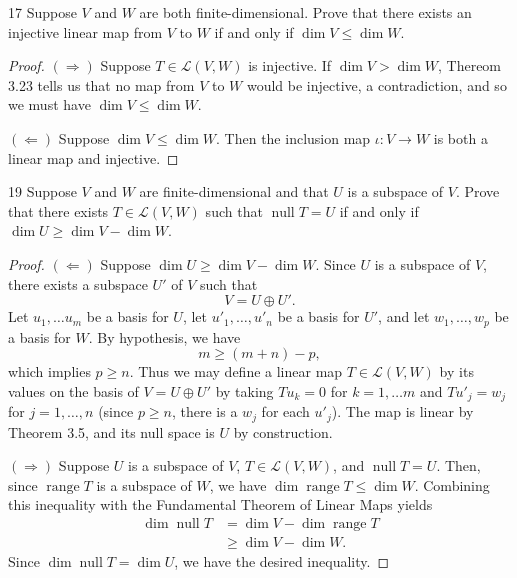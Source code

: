 \documentclass[11pt]{extarticle}
\newenvironment{problem}[1]{\begin{prob*}{#1}{}}{\end{prob*}}
\newcommand{\Hom}{\mathcal{L}}
\DeclareMathOperator{\Null}{null}
\DeclareMathOperator{\Range}{range}
\begin{document}
\begin{problem}{17}
Suppose $V$ and $W$ are both finite-dimensional.  Prove that there exists an injective linear map from $V$ to $W$ if and only if $\dim V\leq \dim W$.  
\end{problem}
\begin{proof}
$(\Rightarrow)$  Suppose $T\in\Hom(V,W)$ is injective.  If $\dim V > \dim W$, Thereom 3.23 tells us that no map from $V$ to $W$ would be injective, a contradiction, and so we must have $\dim V\leq \dim W$.    
\par $(\Leftarrow)$  Suppose $\dim V\leq \dim W$.  Then the inclusion map $\iota:V\to W$ is both a linear map and injective.
\end{proof}

\begin{problem}{19}
Suppose $V$ and $W$ are finite-dimensional and that $U$ is a subspace of $V$.  Prove that there exists $T\in\Hom(V,W)$ such that $\Null T = U$ if and only if $\dim U\geq \dim V - \dim W$.
\end{problem}
\begin{proof}
$(\Leftarrow)$  Suppose $\dim U \geq \dim V- \dim W$.  Since $U$ is a subspace of $V$, there exists a subspace $U'$ of $V$ such that 
\begin{equation*}
V = U \oplus U'.
\end{equation*}
Let $u_1,\dots u_m$ be a basis for $U$, let $u'_1,\dots, u'_n$ be a basis for $U'$, and let $w_1,\dots, w_p$ be a basis for $W$.  By hypothesis, we have
\begin{equation*}
m \geq (m + n) - p,
\end{equation*}
which implies $p\geq n$.  Thus we may define a linear map $T\in\Hom(V, W)$ by its values on the basis of $V=U\oplus U'$ by taking $Tu_k = 0$ for $k = 1,\dots m$ and $Tu'_j = w_j$ for $j = 1,\dots, n$ (since $p\geq n$, there is a $w_j$ for each $u'_j$).  The map is linear by Theorem 3.5, and its null space is $U$ by construction.
\par $(\Rightarrow)$ Suppose $U$ is a subspace of $V$, $T\in\Hom(V,W)$, and $\Null T = U$.  Then, since $\Range T$ is a subspace of $W$, we have $\dim\Range T \leq \dim W$.  Combining this inequality with the Fundamental Theorem of Linear Maps yields
\begin{align*}
\dim \Null T &= \dim V - \dim\Range T\\
&\geq \dim V - \dim W.
\end{align*}
Since $\dim \Null T = \dim U$, we have the desired inequality.
\end{proof}
\end{document}
